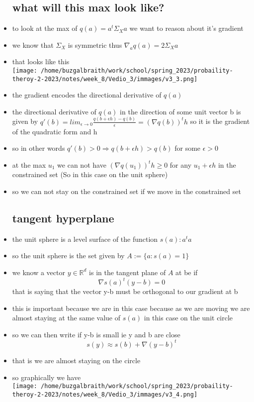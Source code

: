 \documentclass{article}
\begin{document}
\begin{itemize}
\subsection*{what will this max look like?}
\item to look at the max of $q(a)=a^t\Sigma_{X}a$ we want to reason about it's gradient 
\item we know that $\Sigma_{X}$ is symmetric thus $\nabla_{a}q(a)=2\Sigma_{X}a$
\item that looks like this\\ \texttt{[image: /home/buzgalbraith/work/school/spring\_2023/probaility-theroy-2-2023/notes/week\_8/Vedio\_3/immages/v3\_3.png]}
\item the gradient encodes the directional derivative of $q(a)$
\item the directional derivative of $q(a)$ in the direction of some unit vector b is given by 
$q'(b)=lim_{\epsilon\rightarrow 0}\frac{q(b+\epsilon h)-q(b)}{\epsilon}=(\nabla q(b))^th$ so it is the gradient of the quadratic form and h 
\item so in other words $q'(b)>0 \Rightarrow q(b+\epsilon h)>q(b)$ for some $\epsilon>0$
\item  at the max $u_1$ we can not have $(\nabla q(u_1))^{t}h\geq 0$ for any $u_1+\epsilon h$ in the constrained set (So in this case on the unit sphere)
\item so we can not stay on the constrained set if we move in the constrained set 
\subsection*{tangent hyperplane}
\item the unit sphere is a level surface of the function $s(a):a^ta$
\item so the unit sphere is the set given by $A:=\{a:s(a)=1\}$
\item we know a vector $y\in \mathbb{R}^{d}$ is in the tangent plane of $A$ at be if $$\nabla s(a)^{t}(y-b)=0$$ that is saying that the vector y-b must be orthogonal to our gradient at b 
\item this is important because we are in this case because as we are moving we are almost staying at the same value of $s(a)$ in this case on the unit circle
\item so we can then write if y-b is small ie y and b are close $$s(y)\approx s(b)+\nabla(y-b)^{t}$$
\item that is we are almost staying on the circle
\item so graphically we have \\ \texttt{[image: /home/buzgalbraith/work/school/spring\_2023/probaility-theroy-2-2023/notes/week\_8/Vedio\_3/immages/v3\_4.png]}

\end{itemize}
\end{document}
